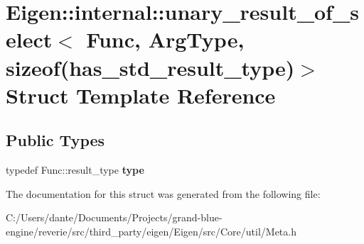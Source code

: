 \hypertarget{struct_eigen_1_1internal_1_1unary__result__of__select_3_01_func_00_01_arg_type_00_01sizeof_07has__std__result__type_08_4}{}\section{Eigen\+::internal\+::unary\+\_\+result\+\_\+of\+\_\+select$<$ Func, Arg\+Type, sizeof(has\+\_\+std\+\_\+result\+\_\+type)$>$ Struct Template Reference}
\label{struct_eigen_1_1internal_1_1unary__result__of__select_3_01_func_00_01_arg_type_00_01sizeof_07has__std__result__type_08_4}
\subsection*{Public Types}
\begin{DoxyCompactItemize}
\item 
\mbox{\label{struct_eigen_1_1internal_1_1unary__result__of__select_3_01_func_00_01_arg_type_00_01sizeof_07has__std__result__type_08_4_a1619b45bef06c164e0863c5f6b018c4b}} 
typedef Func\+::result\+\_\+type {\bfseries type}
\end{DoxyCompactItemize}


The documentation for this struct was generated from the following file\+:\begin{DoxyCompactItemize}
\item 
C\+:/\+Users/dante/\+Documents/\+Projects/grand-\/blue-\/engine/reverie/src/third\+\_\+party/eigen/\+Eigen/src/\+Core/util/Meta.\+h\end{DoxyCompactItemize}
